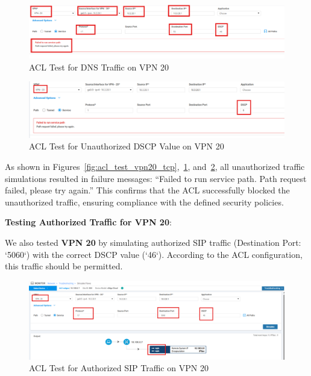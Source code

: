 \documentclass[12pt,english]{report}
\begin{document}
\begin{figure}[H]
    \centering
    \includegraphics[width=1\textwidth]{chapter 4/jdid/vpn20_DNS.png}
    \caption{ACL Test for DNS Traffic on VPN 20}
    \label{fig:acl_test_vpn20_dns}
\end{figure}

\begin{figure}[H]
    \centering
    \includegraphics[width=1\textwidth]{chapter 4/jdid/vpn20_wrdscp.png}
    \caption{ACL Test for Unauthorized DSCP Value on VPN 20}
    \label{fig:acl_test_vpn20_dscp}
\end{figure}

As shown in Figures~\ref{fig:acl_test_vpn20_tcp},~\ref{fig:acl_test_vpn20_dns}, and~\ref{fig:acl_test_vpn20_dscp}, all unauthorized traffic simulations resulted in failure messages: “Failed to run service path. Path request failed, please try again.” This confirms that the ACL successfully blocked the unauthorized traffic, ensuring compliance with the defined security policies.

\textbf{Testing Authorized Traffic for VPN 20}:

We also tested \textbf{VPN 20} by simulating authorized SIP traffic (Destination Port: `5060`) with the correct DSCP value (`46`). According to the ACL configuration, this traffic should be permitted.

\begin{figure}[H]
    \centering
    \includegraphics[width=1\textwidth]{chapter 4/jdid/vpn20_correct.png}
    \caption{ACL Test for Authorized SIP Traffic on VPN 20}
    \label{fig:acl_test_vpn20_sip}
\end{figure}
\end{document}
